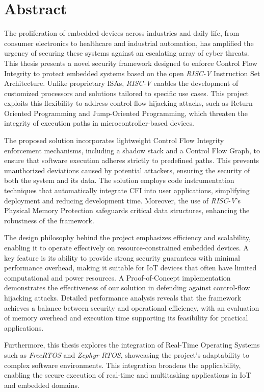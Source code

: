 \chapter*{Abstract}
\label{cha:abstract}

The proliferation of embedded devices across industries and daily life, from consumer
electronics to healthcare and industrial automation, has amplified the urgency
of securing these systems against an escalating array of cyber threats. This thesis
presents a novel security framework designed to enforce Control Flow Integrity to
protect embedded systems based on the open \textit{RISC-V} Instruction Set
Architecture. Unlike proprietary ISAs, \textit{RISC-V} enables the development of
customized processors and solutions tailored to specific use cases. This project
exploits this flexibility to address control-flow hijacking attacks, such as Return-Oriented
Programming and Jump-Oriented Programming, which threaten the integrity of
execution paths in microcontroller-based devices.

The proposed solution incorporates lightweight Control Flow Integrity
enforcement mechanisms, including a shadow stack and a Control Flow Graph, to
ensure that software execution adheres strictly to predefined paths. This prevents
unauthorized deviations caused by potential attackers, ensuring the security of
both the system and its data. The solution employs code instrumentation techniques
that automatically integrate CFI into user applications, simplifying deployment
and reducing development time. Moreover, the use of \textit{RISC-V}'s Physical Memory
Protection safeguards critical data structures, enhancing the robustness of the
framework.

The design philosophy behind the project emphasizes efficiency and scalability, enabling
it to operate effectively on resource-constrained embedded devices. A key
feature is its ability to provide strong security guarantees with minimal
performance overhead, making it suitable for IoT devices that often have limited
computational and power resources. A Proof-of-Concept implementation
demonstrates the effectiveness of our solution in defending against control-flow
hijacking attacks. Detailed performance analysis reveals that the framework achieves
a balance between security and operational efficiency, with an evaluation of
memory overhead and execution time supporting its feasibility for practical
applications.

Furthermore, this thesis explores the integration of Real-Time Operating Systems
such as \textit{FreeRTOS} and \textit{Zephyr RTOS}, showcasing the project's
adaptability to complex software environments. This integration broadens the applicability,
enabling the secure execution of real-time and multitasking applications in IoT
and embedded domains.

